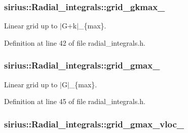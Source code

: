 \hypertarget{classsirius_1_1_radial__integrals_ae8c8c5224d9b666532620614639d3d4d}{}
\subsubsection[{grid\+\_\+gkmax\+\_\+}]{ sirius\+::\+Radial\+\_\+integrals\+::grid\+\_\+gkmax\+\_\+\hspace{0.3cm}{\ttfamily [private]}}\label{classsirius_1_1_radial__integrals_ae8c8c5224d9b666532620614639d3d4d}


Linear grid up to $\vert$\+G+k$\vert$\+\_\+\{max\}. 



Definition at line 42 of file radial\+\_\+integrals.\+h.

\hypertarget{classsirius_1_1_radial__integrals_a2012d496c3e7235c19f127bb9e69597f}{}
\subsubsection[{grid\+\_\+gmax\+\_\+}]{ sirius\+::\+Radial\+\_\+integrals\+::grid\+\_\+gmax\+\_\+\hspace{0.3cm}{\ttfamily [private]}}\label{classsirius_1_1_radial__integrals_a2012d496c3e7235c19f127bb9e69597f}


Linear grid up to $\vert$\+G$\vert$\+\_\+\{max\}. 



Definition at line 45 of file radial\+\_\+integrals.\+h.

\hypertarget{classsirius_1_1_radial__integrals_ad38cbd22cfa313f81cc5f83e9fc8c7fe}{}
\subsubsection[{grid\+\_\+gmax\+\_\+vloc\+\_\+}]{ sirius\+::\+Radial\+\_\+integrals\+::grid\+\_\+gmax\+\_\+vloc\+\_\+\hspace{0.3cm}{\ttfamily [private]}}\label{classsirius_1_1_radial__integrals_ad38cbd22cfa313f81cc5f83e9fc8c7fe}


